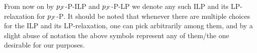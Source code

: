 From now on by \textsc{$p_{\mathcal{F}}$-P-ILP} and \textsc{$p_{\mathcal{F}}$-P-LP} we denote any such ILP and its LP-relaxation for \textsc{$p_{\mathcal{F}}$-P}. It should be noted that whenever there are multiple choices for the ILP and its LP-relaxation, one can pick arbitrarily among them, and by a slight abuse of notation the above symbols represent any of them/the one desirable for our purposes.
